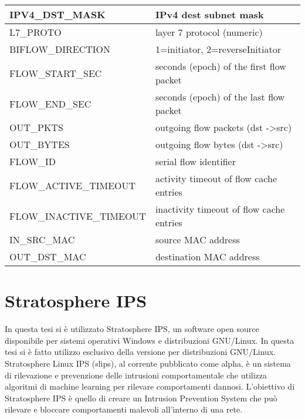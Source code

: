 \documentclass[../main.tex]{subfiles}
\begin{document}
\begin{table}[H]
\begin{tabular}{|l|l|}
IPV4\_DST\_MASK                      & IPv4 dest subnet mask                         \\ \hline
L7\_PROTO                            & layer 7 protocol (numeric)                    \\ \hline
BIFLOW\_DIRECTION                    & 1=initiator, 2=reverseInitiator               \\ \hline
FLOW\_START\_SEC                     & seconds (epoch) of the first flow packet      \\ \hline
FLOW\_END\_SEC                       & seconds (epoch) of the last flow packet       \\ \hline
OUT\_PKTS                            & outgoing flow packets (dst -\textgreater src) \\ \hline
OUT\_BYTES                           & outgoing flow bytes (dst -\textgreater src)   \\ \hline
FLOW\_ID                             & serial flow identifier                        \\ \hline
FLOW\_ACTIVE\_TIMEOUT                & activity timeout of flow cache entries        \\ \hline
FLOW\_INACTIVE\_TIMEOUT              & inactivity timeout of flow cache entries      \\ \hline
IN\_SRC\_MAC                         & source MAC address                            \\ \hline
OUT\_DST\_MAC                        & destination MAC address                       \\ \hline
\end{tabular}
\end{table}

\section{Stratosphere IPS}
In questa tesi si è utilizzato Stratosphere IPS, un software open source disponibile per sistemi operativi Windows e distribuzioni GNU/Linux. In questa tesi si è fatto utilizzo esclusivo della versione per distribuzioni GNU/Linux.
Stratosphere Linux IPS (slips), al corrente pubblicato come alpha, è un sistema di rilevazione e prevenzione delle intrusioni comportamentale che utilizza algoritmi di machine learning per rilevare comportamenti dannosi. 
L'obiettivo di Stratosphere IPS è quello di creare un Intrusion Prevention System che può rilevare e bloccare comportamenti malevoli all'interno di una rete.
\end{document}
